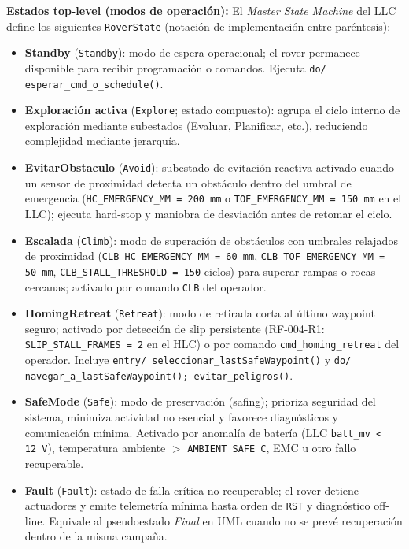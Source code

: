 \textbf{Estados top-level (modos de operación):} El \emph{Master State Machine} del LLC define los siguientes \texttt{RoverState} (notación de implementación entre paréntesis):
\begin{itemize}
  \item \textbf{Standby} (\texttt{Standby}): modo de espera operacional; el rover permanece disponible para recibir programación o comandos. Ejecuta \texttt{do/ esperar\_cmd\_o\_schedule()}. \cite{UMLStateMachinesConcepts1}
  \item \textbf{Exploración activa} (\texttt{Explore}; estado compuesto): agrupa el ciclo interno de exploración mediante subestados (Evaluar, Planificar, etc.), reduciendo complejidad mediante jerarquía. \cite{CompositeStates1,UMLStateMachinesConcepts2}
  \item \textbf{EvitarObstaculo} (\texttt{Avoid}): subestado de evitación reactiva activado cuando un sensor de proximidad detecta un obstáculo dentro del umbral de emergencia (\texttt{HC\_EMERGENCY\_MM = 200\,mm} o \texttt{TOF\_EMERGENCY\_MM = 150\,mm} en el LLC); ejecuta hard-stop y maniobra de desviación antes de retomar el ciclo. \cite{UMLStateMachinesConcepts2}
  \item \textbf{Escalada} (\texttt{Climb}): modo de superación de obstáculos con umbrales relajados de proximidad (\texttt{CLB\_HC\_EMERGENCY\_MM = 60\,mm}, \texttt{CLB\_TOF\_EMERGENCY\_MM = 50\,mm}, \texttt{CLB\_STALL\_THRESHOLD = 150} ciclos) para superar rampas o rocas cercanas; activado por comando \texttt{CLB} del operador. \cite{UMLStateMachinesConcepts1}
  \item \textbf{HomingRetreat} (\texttt{Retreat}): modo de retirada corta al último waypoint seguro; activado por detección de slip persistente (RF-004-R1: \texttt{SLIP\_STALL\_FRAMES = 2} en el HLC) o por comando \texttt{cmd\_homing\_retreat} del operador. Incluye \texttt{entry/ seleccionar\_lastSafeWaypoint()} y \texttt{do/ navegar\_a\_lastSafeWaypoint(); evitar\_peligros()}. \cite{UMLStateMachinesConcepts2,SafeModeContext1}
  \item \textbf{SafeMode} (\texttt{Safe}): modo de preservación (safing); prioriza seguridad del sistema, minimiza actividad no esencial y favorece diagnósticos y comunicación mínima. Activado por anomalía de batería (LLC \texttt{batt\_mv < 12\,V}), temperatura ambiente $>$ \texttt{AMBIENT\_SAFE\_C}, EMC u otro fallo recuperable. \cite{SafeModeContext1,UMLStateMachinesConcepts2}
  \item \textbf{Fault} (\texttt{Fault}): estado de falla crítica no recuperable; el rover detiene actuadores y emite telemetría mínima hasta orden de \texttt{RST} y diagnóstico off-line. Equivale al pseudoestado \emph{Final} en UML cuando no se prevé recuperación dentro de la misma campaña. \cite{UMLStateMachinesConcepts2}
\end{itemize}

